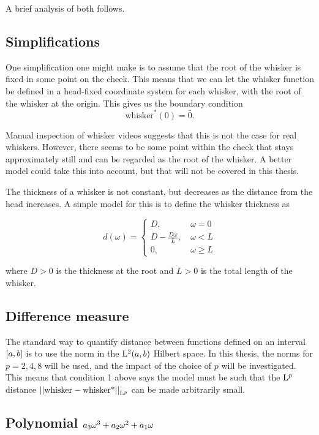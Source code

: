 A brief analysis of both follows.

\subsection{Simplifications}
One simplification one might make is to assume that the root of the
whisker is fixed in some point on the cheek. This means that we can
let the whisker function be defined in a head-fixed coordinate system
for each whisker, with the root of the whisker at the origin. This
gives us the boundary condition
\begin{equation}
    \label{eq:bv_root}
    \text{whisker}^*(0)=\bar{0}.
\end{equation}

Manual inspection of whisker videos suggests that this is not the case
for real whiskers. However, there seems to be some point within the
cheek that stays approximately still and can be regarded as the root
of the whisker. A better model could take this into account, but that
will not be covered in this thesis.

The thickness of a whisker is not constant, but decreases as the
distance from the head increases. A simple model for this is to define
the whisker thickness as

\begin{equation}
    d(\omega) = \begin{cases}
        D,~& \omega=0\\
        D-\frac{D\omega}{L},~& \omega<L\\
        0,~& \omega\ge L
    \end{cases}
\end{equation}

where $D>0$ is the thickness at the root and $L>0$ is the total length of the
whisker.


\subsection{Difference measure}
The standard way to quantify distance between functions defined on an
interval $\interval{a}{b}$ is to use the norm in the $\Lp[2](a, b)$
Hilbert space. In this thesis, the norms for $p = 2, 4, 8$ will be
used, and the impact of the choice of $p$ will be investigated. This
means that condition 1 above says the model must be such that the
$\Lp$ distance $\Lpnorm{\text{whisker} - \text{whisker*}}$ can be made
arbitrarily small.


\subsection{Polynomial $\Spline{\omega}$}


